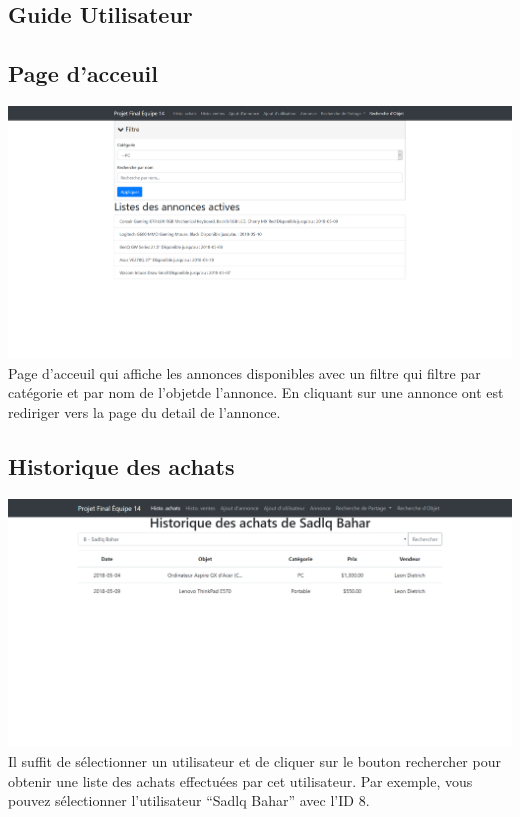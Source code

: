 \documentclass[a4paper,12pt]{article}
\begin{document}
\begin{spacing}{1}
	\section*{Guide Utilisateur}
	\subsection*{Page d'acceuil}
	\includegraphics[scale=0.3]{index.png}
	Page d'acceuil qui affiche les annonces disponibles avec un filtre qui filtre par catégorie et par nom de l'objetde l'annonce. En cliquant sur une annonce ont est rediriger vers la page du detail de l'annonce.
	\subsection*{Historique des achats}
	\includegraphics[scale=0.4]{historique_achats.png}
Il suffit de sélectionner un utilisateur et de cliquer sur le bouton rechercher pour obtenir une liste des achats effectuées par cet utilisateur. Par exemple, vous pouvez sélectionner l'utilisateur ``Sadlq Bahar'' avec l'ID 8.

\end{spacing}
\end{document}
